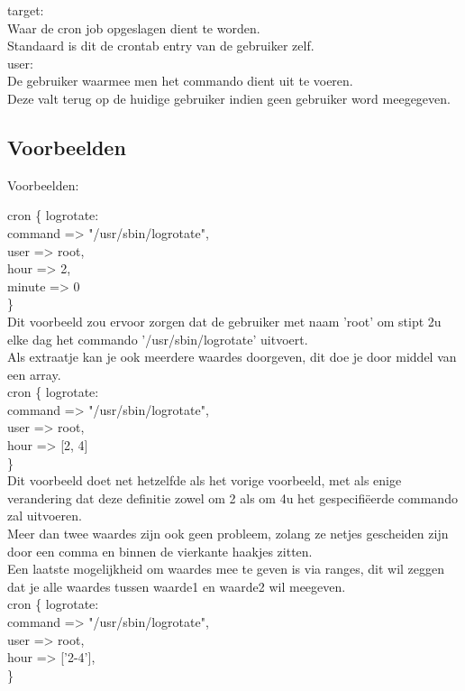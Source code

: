 		target:\\
		Waar de cron job opgeslagen dient te worden.\\
		Standaard is dit de crontab entry van de gebruiker zelf.\\

		user:\\
		De gebruiker waarmee men het commando dient uit te voeren.\\
		Deze valt terug op de huidige gebruiker indien geen gebruiker word meegegeven.\\

\subsection{Voorbeelden}
Voorbeelden:

	cron \{ logrotate:\\
		command => "/usr/sbin/logrotate",\\
		user => root,\\
		hour => 2,\\
		minute => 0\\
	\}\\

	Dit voorbeeld zou ervoor zorgen dat de gebruiker met naam 'root' om stipt 2u elke dag het commando '/usr/sbin/logrotate' uitvoert.\\
	Als extraatje kan je ook meerdere waardes doorgeven, dit doe je door middel van een array.\\

	cron \{ logrotate:\\
		command => "/usr/sbin/logrotate",\\
		user => root,\\
		hour => [2, 4]\\
	\}\\

	Dit voorbeeld doet net hetzelfde als het vorige voorbeeld, met als enige verandering dat deze definitie zowel om 2 als om 4u het gespecifi\"{e}erde commando zal uitvoeren.\\
	Meer dan twee waardes zijn ook geen probleem, zolang ze netjes gescheiden zijn door een comma en binnen de vierkante haakjes zitten.\\

	Een laatste mogelijkheid om waardes mee te geven is via ranges, dit wil zeggen dat je alle waardes tussen waarde1 en waarde2 wil meegeven.\\

	cron \{ logrotate:\\
		command => "/usr/sbin/logrotate",\\
		user => root,\\
		hour => ['2-4'],\\
	\}\\

